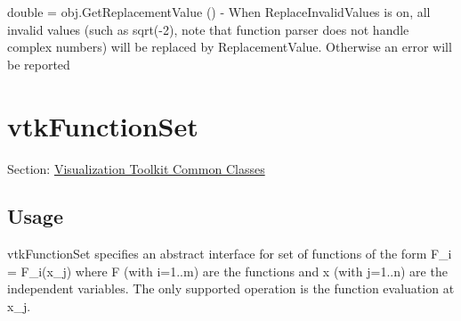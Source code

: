 \begin{DoxyItemize}
\item {\ttfamily double = obj.\-Get\-Replacement\-Value ()} -\/ When Replace\-Invalid\-Values is on, all invalid values (such as sqrt(-\/2), note that function parser does not handle complex numbers) will be replaced by Replacement\-Value. Otherwise an error will be reported  
\end{DoxyItemize}\hypertarget{vtkcommon_vtkfunctionset}{}\section{vtk\-Function\-Set}\label{vtkcommon_vtkfunctionset}
Section\-: \hyperlink{sec_vtkcommon}{Visualization Toolkit Common Classes} \hypertarget{vtkwidgets_vtkxyplotwidget_Usage}{}\subsection{Usage}\label{vtkwidgets_vtkxyplotwidget_Usage}
vtk\-Function\-Set specifies an abstract interface for set of functions of the form F\-\_\-i = F\-\_\-i(x\-\_\-j) where F (with i=1..m) are the functions and x (with j=1..n) are the independent variables. The only supported operation is the function evaluation at x\-\_\-j.

